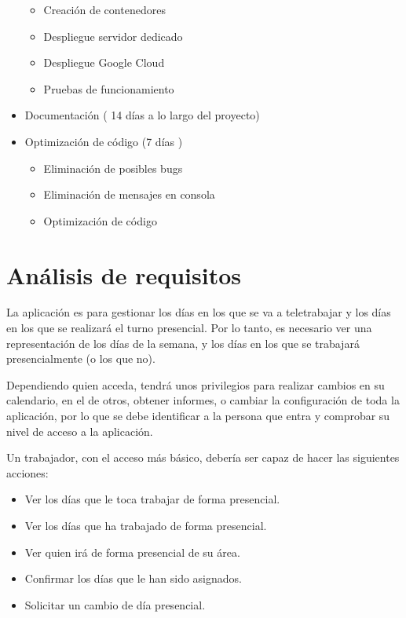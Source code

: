 \documentclass[11pt,spanish,listoffigures,listoftables]{tfgetsinf}
\begin{document}
\begin{itemize}
   \begin{itemize}
      \item Creación de contenedores
      \item Despliegue servidor dedicado
      \item Despliegue Google Cloud
      \item Pruebas de funcionamiento
   \end{itemize}
   \item Documentación ( 14 días a lo largo del proyecto)
   \item Optimización de código (7 días )
   \begin{itemize}
      \item Eliminación de posibles bugs
      \item Eliminación de mensajes en consola
      \item Optimización de código
   \end{itemize}
\end{itemize}

\chapter{Análisis de requisitos}

La aplicación es para gestionar los días en los que se va a teletrabajar y los días en los que se realizará el turno presencial. 
Por lo tanto, es necesario ver una representación de los días de la semana, y los días en los que se trabajará presencialmente (o los que no).

Dependiendo quien acceda, tendrá unos privilegios para realizar cambios en su calendario, en el de otros, obtener informes, o cambiar la configuración de toda la aplicación, por lo que se debe identificar a la persona que entra y comprobar su nivel de acceso a la aplicación.

Un trabajador, con el acceso más básico, debería ser capaz de hacer las siguientes acciones:

\begin{itemize}
   \item Ver los días que le toca trabajar de forma presencial.
   \item Ver los días que ha trabajado de forma presencial.
   \item Ver quien irá de forma presencial de su área.
   \item Confirmar los días que le han sido asignados.
   \item Solicitar un cambio de día presencial.
\end{itemize}
\end{document}

